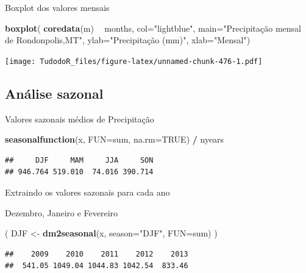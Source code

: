 \documentclass[
]{book}
\newenvironment{Shaded}{\begin{snugshade}}{\end{snugshade}}
\newcommand{\DataTypeTok}[1]{\textcolor[rgb]{0.13,0.29,0.53}{#1}}
\newcommand{\KeywordTok}[1]{\textcolor[rgb]{0.13,0.29,0.53}{\textbf{#1}}}
\newcommand{\NormalTok}[1]{#1}
\newcommand{\OperatorTok}[1]{\textcolor[rgb]{0.81,0.36,0.00}{\textbf{#1}}}
\newcommand{\OtherTok}[1]{\textcolor[rgb]{0.56,0.35,0.01}{#1}}
\newcommand{\StringTok}[1]{\textcolor[rgb]{0.31,0.60,0.02}{#1}}
\begin{document}
Boxplot dos valores mensais

\begin{Shaded}
\begin{Highlighting}[]
\KeywordTok{boxplot}\NormalTok{( }\KeywordTok{coredata}\NormalTok{(m) }\OperatorTok{~}\StringTok{ }\NormalTok{months, }
         \DataTypeTok{col=}\StringTok{"lightblue"}\NormalTok{, }
         \DataTypeTok{main=}\StringTok{"Precipitação mensal de Rondonpolis,MT"}\NormalTok{,}
        \DataTypeTok{ylab=}\StringTok{"Precipitação (mm)"}\NormalTok{, }\DataTypeTok{xlab=}\StringTok{"Mensal"}\NormalTok{)}
\end{Highlighting}
\end{Shaded}

\texttt{[image: TudodoR\_files/figure-latex/unnamed-chunk-476-1.pdf]}

\hypertarget{anuxe1lise-sazonal}{%
\subsection{Análise sazonal}\label{anuxe1lise-sazonal}}

Valores sazonais médios de Precipitação

\begin{Shaded}
\begin{Highlighting}[]
\KeywordTok{seasonalfunction}\NormalTok{(x, }\DataTypeTok{FUN=}\NormalTok{sum, }\DataTypeTok{na.rm=}\OtherTok{TRUE}\NormalTok{) }\OperatorTok{/}\StringTok{ }\NormalTok{nyears}
\end{Highlighting}
\end{Shaded}

\begin{verbatim}
##     DJF     MAM     JJA     SON 
## 946.764 519.010  74.016 390.714
\end{verbatim}

Extraindo os valores sazonais para cada ano

Dezembro, Janeiro e Fevereiro

\begin{Shaded}
\begin{Highlighting}[]
\NormalTok{( DJF <-}\StringTok{ }\KeywordTok{dm2seasonal}\NormalTok{(x, }\DataTypeTok{season=}\StringTok{"DJF"}\NormalTok{, }\DataTypeTok{FUN=}\NormalTok{sum) )}
\end{Highlighting}
\end{Shaded}

\begin{verbatim}
##    2009    2010    2011    2012    2013 
##  541.05 1049.04 1044.83 1042.54  833.46
\end{verbatim}
\end{document}
